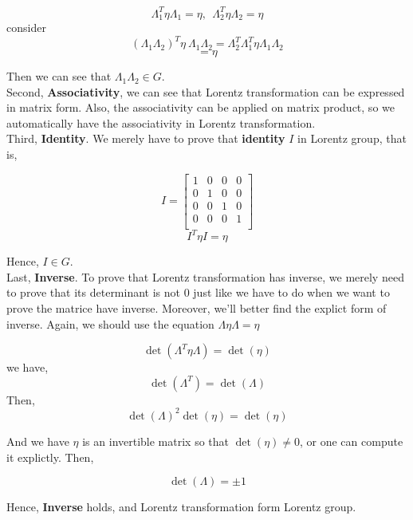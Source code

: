 \documentclass[12pt]{article}
\begin{document}
\begin{center}
    \[ \Lambda_1^T \eta \Lambda_1 = \eta,\ \ \Lambda^T_2 \eta \Lambda_2 = \eta \]
    consider
    \[ \left(\Lambda_1 \Lambda_2\right)^T \eta\ \Lambda_1 \Lambda_2 = \Lambda_2^T \Lambda_1^T \eta \Lambda_1 \Lambda_2 \]
    \[ = \eta \]
\end{center}

Then we can see that $\Lambda_1\Lambda_2 \in G$.
\\
\indent Second, \textbf{Associativity}, we can see that Lorentz transformation can be expressed in matrix form. Also, the associativity can be applied on matrix product, so we automatically have the associativity in Lorentz transformation.
\\
\indent Third, \textbf{Identity}. We merely have to prove that \textbf{identity} $I$ in Lorentz group, that is,

\begin{center}
    \[ I = \begin{bmatrix}
        1&0&0&0\\
        0&1&0&0\\
        0&0&1&0\\
        0&0&0&1\\
    \end{bmatrix} \]
    \[ I^T \eta I = \eta \]
\end{center}

Hence, $I \in G$.
\\
\indent Last, \textbf{Inverse}. To prove that Lorentz transformation has inverse, we merely need to prove that its determinant is not $0$ just like we have to do when we want to prove the matrice have inverse. Moreover, we'll better find the explict form of inverse. Again, we should use the equation $\Lambda \eta \Lambda = \eta$

\begin{center}
    \[ \det\left(\Lambda^T \eta \Lambda\right) = \det(\eta) \]
    we have,
    \[ \det\left(\Lambda^T\right) = \det\left(\Lambda\right)\]
    Then,
    \[ \det\left(\Lambda\right)^2\det(\eta) = \det(\eta) \]
\end{center}

And we have $\eta$ is an invertible matrix so that $\det(\eta) \ne 0$, or one can compute it explictly. Then,

\begin{center}
    \[ \det\left(\Lambda\right) = \pm 1 \]
\end{center}

Hence, \textbf{Inverse} holds, and Lorentz transformation form Lorentz group.
\end{document}
